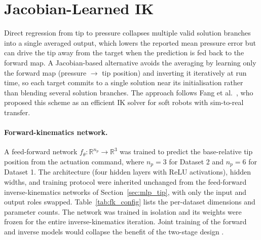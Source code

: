 \section{Jacobian-Learned IK}
\label{sec:jacobian}

Direct regression from tip to pressure collapses multiple valid solution branches into a single averaged output, which lowers the reported mean pressure error but can drive the tip away from the target when the prediction is fed back to the forward map. A Jacobian-based alternative avoids the averaging by learning only the forward map (pressure $\to$ tip position) and inverting it iteratively at run time, so each target commits to a single solution near its initialisation rather than blending several solution branches. The approach follows Fang et al.\ \cite{fang2022jacobian}, who proposed this scheme as an efficient IK solver for soft robots with sim-to-real transfer.

\paragraph{Forward-kinematics network.}
A feed-forward network $f_{\theta}: \mathbb{R}^{n_p} \to \mathbb{R}^{3}$ was trained to predict the base-relative tip position from the actuation command, where $n_p = 3$ for Dataset 2 and $n_p = 6$ for Dataset 1. The architecture (four hidden layers with ReLU activations), hidden widths, and training protocol were inherited unchanged from the feed-forward inverse-kinematics networks of Section~\ref{sec:mlp_tip}, with only the input and output roles swapped. Table~\ref{tab:fk_config} lists the per-dataset dimensions and parameter counts. The network was trained in isolation and its weights were frozen for the entire inverse-kinematics iteration. Joint training of the forward and inverse models would collapse the benefit of the two-stage design \cite{fang2022jacobian}.

